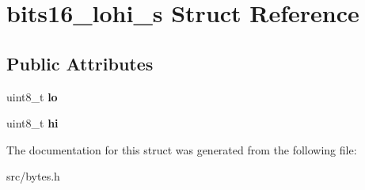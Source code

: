 \hypertarget{structbits16__lohi__s}{}\section{bits16\+\_\+lohi\+\_\+s Struct Reference}
\label{structbits16__lohi__s}
\subsection*{Public Attributes}
\begin{DoxyCompactItemize}
\item 
\hypertarget{structbits16__lohi__s_ad0b319bb03b45d532afee478c17d54cb}{}\label{structbits16__lohi__s_ad0b319bb03b45d532afee478c17d54cb} 
uint8\+\_\+t {\bfseries lo}
\item 
\hypertarget{structbits16__lohi__s_ac965f4c8b992ff605dd2dd2ec494a456}{}\label{structbits16__lohi__s_ac965f4c8b992ff605dd2dd2ec494a456} 
uint8\+\_\+t {\bfseries hi}
\end{DoxyCompactItemize}


The documentation for this struct was generated from the following file\+:\begin{DoxyCompactItemize}
\item 
src/bytes.\+h\end{DoxyCompactItemize}
